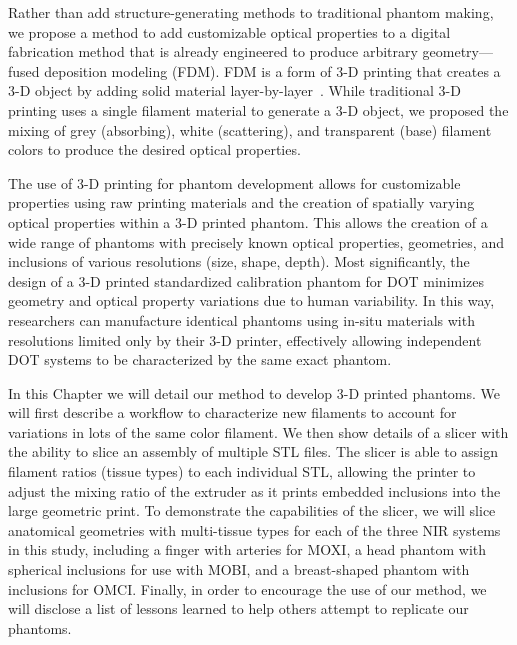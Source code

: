 Rather than add structure-generating methods to traditional phantom making, we propose a method to add customizable optical properties to a digital fabrication method that is already engineered to produce arbitrary geometry---fused deposition modeling (FDM). FDM is a form of 3-D printing that creates a 3-D object by adding solid material layer-by-layer~\cite{Dong2015}. While traditional 3-D printing uses a single filament material to generate a 3-D object, we proposed the mixing of grey (absorbing), white (scattering), and transparent (base) filament colors to produce the desired optical properties. 

The use of 3-D printing for phantom development allows for customizable properties using raw printing materials and the creation of spatially varying optical properties within a 3-D printed phantom. This allows the creation of a wide range of phantoms with precisely known optical properties, geometries, and inclusions of various resolutions (size, shape, depth). Most significantly, the design of a 3-D printed standardized calibration phantom for DOT minimizes geometry and optical property variations due to human variability. In this way, researchers can manufacture identical phantoms using in-situ materials with resolutions limited only by their 3-D printer, effectively allowing independent DOT systems to be characterized by the same exact phantom. 

In this Chapter we will detail our method to develop 3-D printed phantoms. We will first describe a workflow to characterize new filaments to account for variations in lots of the same color filament. We then show details of a slicer with the ability to slice an assembly of multiple STL files. The slicer is able to assign filament ratios (tissue types) to each individual STL, allowing the printer to adjust the mixing ratio of the extruder as it prints embedded inclusions into the large geometric print. To demonstrate the capabilities of the slicer, we will slice anatomical geometries with multi-tissue types for each of the three NIR systems in this study, including a finger with arteries for MOXI, a head phantom with spherical inclusions for use with MOBI, and a breast-shaped phantom with inclusions for OMCI. Finally, in order to encourage the use of our method, we will disclose a list of lessons learned to help others attempt to replicate our phantoms. 



